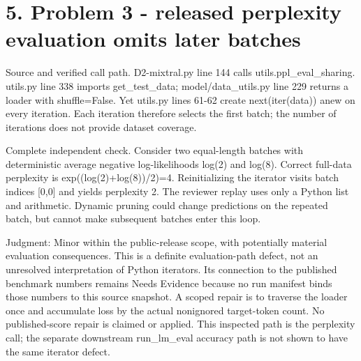 \documentclass[10pt]{article}
\begin{document}
\section*{5. Problem 3 - released perplexity evaluation omits later batches}
Source and verified call path. D2-mixtral.py line 144 calls utils.ppl\_eval\_sharing. utils.py line 338 imports get\_test\_data; model/data\_utils.py line 229 returns a loader with shuffle=False. Yet utils.py lines 61-62 create next(iter(data)) anew on every iteration. Each iteration therefore selects the first batch; the number of iterations does not provide dataset coverage.\par
Complete independent check. Consider two equal-length batches with deterministic average negative log-likelihoods log(2) and log(8). Correct full-data perplexity is exp((log(2)+log(8))/2)=4. Reinitializing the iterator visits batch indices [0,0] and yields perplexity 2. The reviewer replay uses only a Python list and arithmetic. Dynamic pruning could change predictions on the repeated batch, but cannot make subsequent batches enter this loop.\par
Judgment: Minor within the public-release scope, with potentially material evaluation consequences. This is a definite evaluation-path defect, not an unresolved interpretation of Python iterators. Its connection to the published benchmark numbers remains Needs Evidence because no run manifest binds those numbers to this source snapshot. A scoped repair is to traverse the loader once and accumulate loss by the actual nonignored target-token count. No published-score repair is claimed or applied. This inspected path is the perplexity call; the separate downstream run\_lm\_eval accuracy path is not shown to have the same iterator defect.\par
\end{document}
